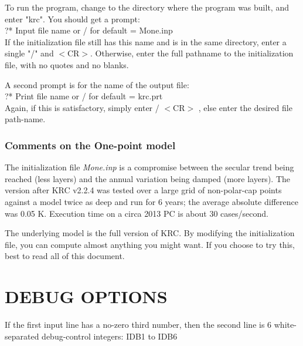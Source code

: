 \documentclass{article}
\newcommand{\qi}{\\ \hspace*{2.em}}      %
\newcommand{\nf}{\textit}  %
\begin{document}
To run the program, change to the directory where the program was built, and
enter "krc". You should get a prompt:
 \qi      ?* Input file name or / for default = Mone.inp  \\
If the initialization file still has this name and is in the same directory,
enter a single "/" and $<$CR$>$. Otherwise, enter the full pathname to the 
initialization file, with no quotes and no blanks.

A second prompt is for the name of the output file: 
 \qi         ?* Print file name or / for default = krc.prt \\
Again, if this is satisfactory, simply enter  / $<$CR$>$ , else enter the desired
file path-name.

\subsubsection{ Comments on the One-point model} %

The initialization file \nf{Mone.inp} is a compromise between the secular trend
being reached (less layers) and the annual variation being damped (more
layers). The version after KRC v2.2.4 was tested over a large grid of
non-polar-cap points against a model twice as deep and run for 6 years; the
average absolute difference was 0.05 K. Execution time on a circa 2013 PC is
about 30 cases/second.

The underlying model is the full version of KRC. By modifying the initialization
file, you can compute almost anything you might want. If you choose to try this,
best to read all of this document.

\section{ DEBUG OPTIONS \label{debug}}
If the first input line has a no-zero third number, then the second line is 6 
white-separated debug-control integers: IDB1 to IDB6
\end{document}
